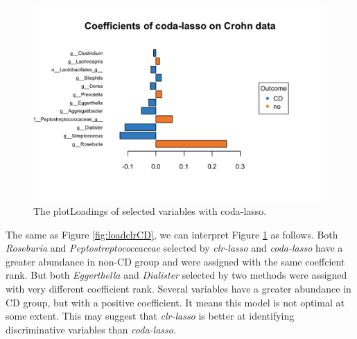 \documentclass[openany]{book}
\newenvironment{Shaded}{\begin{snugshade}}{\end{snugshade}}
\newcommand{\KeywordTok}[1]{\textcolor[rgb]{0.13,0.29,0.53}{\textbf{#1}}}
\newcommand{\DataTypeTok}[1]{\textcolor[rgb]{0.13,0.29,0.53}{#1}}
\newcommand{\StringTok}[1]{\textcolor[rgb]{0.31,0.60,0.02}{#1}}
\newcommand{\CommentTok}[1]{\textcolor[rgb]{0.56,0.35,0.01}{\textit{#1}}}
\newcommand{\OperatorTok}[1]{\textcolor[rgb]{0.81,0.36,0.00}{\textbf{#1}}}
\newcommand{\NormalTok}[1]{#1}
\begin{document}
\begin{Shaded}
\end{Shaded}

\begin{figure}

{\centering \includegraphics[width=1\linewidth]{./Generated_plots/loadcodaCD-1} 

}

\caption{The plotLoadings of selected variables with coda-lasso.}\label{fig:loadcodaCD}
\end{figure}

The same as Figure \ref{fig:loadclrCD}, we can interpret Figure
\ref{fig:loadcodaCD} as follows. Both \emph{Roseburia} and
\emph{Peptostreptococcaceae} selected by \emph{clr-lasso} and
\emph{coda-lasso} have a greater abundance in non-CD group and were
assigned with the same coeffcient rank. But both \emph{Eggerthella} and
\emph{Dialister} selected by two methods were assigned with very
different coefficient rank. Several variables have a greater abundance
in CD group, but with a positive coefficient. It means this model is not
optimal at some extent. This may suggest that \emph{clr-lasso} is better
at identifying discriminative variables than \emph{coda-lasso}.
\end{document}
